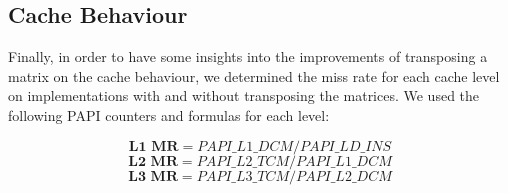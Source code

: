 \documentclass[twoside,twocolumn]{article}
\begin{document}

\subsection{Cache Behaviour}

Finally, in order to have some insights into the improvements of transposing a matrix on the cache behaviour, we determined the miss rate for each cache level on implementations with and without transposing the matrices. We used the following PAPI counters and formulas for each level:

$$\textbf{L1 MR} = PAPI\_L1\_DCM / PAPI\_LD\_INS$$
$$\textbf{L2 MR} = PAPI\_L2\_TCM / PAPI\_L1\_DCM$$
$$\textbf{L3 MR} = PAPI\_L3\_TCM / PAPI\_L2\_DCM$$

\begin{table}[ht]
\centering
{}
\caption{Miss rates of the \textbf{IJK} implementation.}
\label{tab:missrates}
\end{table}

\end{document}
